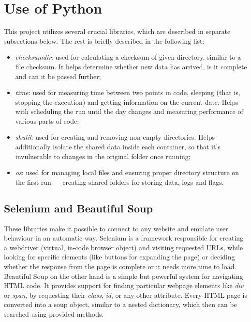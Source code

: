 \section{Use of Python}
This project utilizes several crucial libraries, which are described in separate subsections below. The rest is briefly described in the following list:

\begin{itemize}
    \item \textit{checksumdir}: used for calculating a checksum of given directory, similar to a file checksum. It helps determine whether new data has arrived, is it complete and can it be passed further;
    \item \textit{time}: used for measuring time between two points in code, sleeping (that is, stopping the execution) and getting information on the current date. Helps with scheduling the run until the day changes and measuring performance of various parts of code;
    \item \textit{shutil}: used for creating and removing non-empty directories. Helps additionally isolate the shared data inside each container, so that it's invulnerable to changes in the original folder once running;
    \item \textit{os}: used for managing local files and ensuring proper directory structure on the first run --- creating shared folders for storing data, logs and flags.
\end{itemize}

\subsection{Selenium and Beautiful Soup}
These libraries make it possible to connect to any website and emulate user behaviour in an automatic way. Selenium is a framework responsible for creating a webdriver (virtual, in-code browser object) and visiting requested URLs, while looking for specific elements (like buttons for expanding the page) or deciding whether the response from the page is complete or it needs more time to load. Beautiful Soup on the other hand is a simple but powerful system for navigating HTML code. It provides support for finding particular webpage elements like \textit{div} or \textit{span}, by requesting their \textit{class}, \textit{id}, or any other attribute. Every HTML page is converted into a soup object, similar to a nested dictionary, which then can be searched using provided methods.

